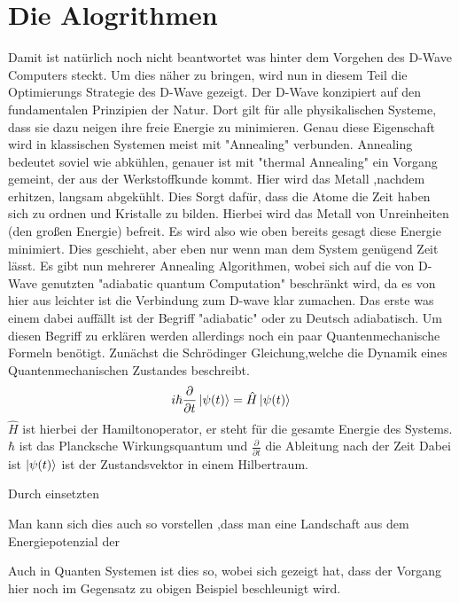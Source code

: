 \documentclass{article}
\begin{document}
\section{Die Alogrithmen}\label{sec:baseAlgo}
Damit ist natürlich noch nicht beantwortet was hinter dem Vorgehen des D-Wave Computers steckt.
Um dies näher zu bringen, wird nun in diesem Teil 
die Optimierungs Strategie des D-Wave gezeigt.
Der D-Wave konzipiert auf den fundamentalen Prinzipien der Natur. Dort gilt für alle physikalischen Systeme, dass sie dazu neigen ihre freie Energie zu minimieren. Genau diese Eigenschaft wird in klassischen 
Systemen meist mit "Annealing" verbunden.
Annealing bedeutet soviel wie abkühlen, genauer ist mit "thermal Annealing" ein Vorgang gemeint, der aus der Werkstoffkunde kommt. Hier wird das Metall ,nachdem  erhitzen, langsam abgekühlt. Dies Sorgt dafür, dass die Atome die Zeit haben sich zu ordnen und Kristalle zu bilden.%
Hierbei wird das Metall von Unreinheiten (den großen Energie) befreit.
Es wird also wie oben bereits gesagt diese Energie minimiert. Dies geschieht, aber eben nur wenn man dem System genügend Zeit lässt. Es gibt nun mehrerer Annealing Algorithmen, wobei sich auf die von D-Wave genutzten "adiabatic quantum Computation" beschränkt wird, da es von hier aus leichter ist die Verbindung zum D-wave klar zumachen. Das erste was einem dabei auffällt ist der Begriff "adiabatic" oder zu Deutsch adiabatisch. Um diesen Begriff zu erklären werden allerdings noch ein paar Quantenmechanische Formeln benötigt. Zunächst die Schrödinger Gleichung,welche die Dynamik eines Quantenmechanischen Zustandes beschreibt.
\begin{equation}
i\hbar\frac{ \partial}{ \partial t} \ket{\psi (t)} = \hat{H} \ket{\psi (t)}
\end{equation}
\newline
$\hat{H}$ ist hierbei der Hamiltonoperator, er steht für die gesamte Energie des Systems.
$\hbar$ ist das Plancksche Wirkungsquantum und
$\frac{ \partial}{ \partial t}$ die Ableitung nach der Zeit
Dabei ist $\ket{\psi (t)}$ ist der Zustandsvektor in einem Hilbertraum.


Durch einsetzten 




Man kann sich dies auch so vorstellen ,dass man eine Landschaft aus dem Energiepotenzial der 

Auch in Quanten Systemen ist dies so, wobei sich gezeigt hat, dass der Vorgang hier noch 
im Gegensatz zu obigen Beispiel beschleunigt wird.
\end{document}
